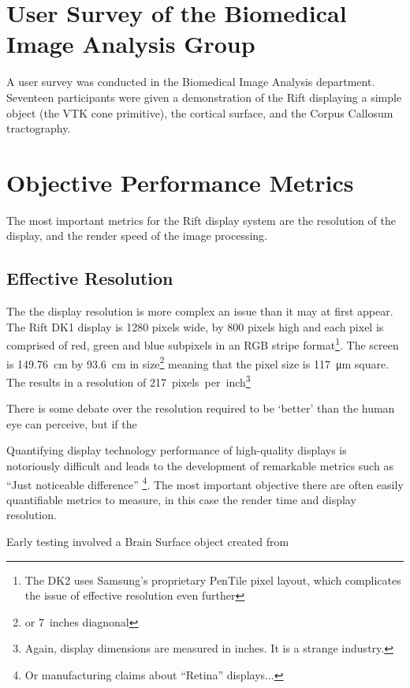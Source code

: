 \documentclass[MSc,paper=a4,pagesize=auto]{icldt}
\begin{document}
\section{User Survey of the Biomedical Image Analysis Group}
A user survey was conducted in the Biomedical Image Analysis department. Seventeen participants were given a demonstration of the Rift displaying a simple object (the VTK cone primitive), the cortical surface, and the Corpus Callosum tractography. 




\section{Objective Performance Metrics}

The most important metrics for the Rift display system are the resolution of the display, and the render speed of the image processing.

\subsection{Effective Resolution}
The the display resolution is more complex an issue than it may at first appear. The Rift DK1 display is 1280 pixels wide, by 800 pixels high and each pixel is comprised of red, green and blue subpixels in an RGB stripe format\footnote{The DK2 uses Samsung's proprietary PenTile pixel layout, which complicates the issue of effective resolution even further}. The screen is \SI{149.76}{cm} by \SI{93.6}{cm} in size\footnote{or \SI{7}{inches} diagnonal} meaning that the pixel size is \SI{117}{\um} square. The results in a resolution of \SI{217}{pixels per inch}\footnote{Again, display dimensions are measured in inches. It is a strange industry.}

There is some debate over the resolution required to be `better' than the human eye can perceive, but if the 



Quantifying display technology performance of high-quality displays is notoriously difficult and leads to the development of remarkable metrics such as ``Just noticeable difference'' \cite{Zhang2008} \footnote{Or manufacturing claims about ``Retina'' displays...}. The most important objective there are often easily quantifiable metrics to measure, in this case the render time and display resolution.

Early testing involved a Brain Surface object created from  
\end{document}

